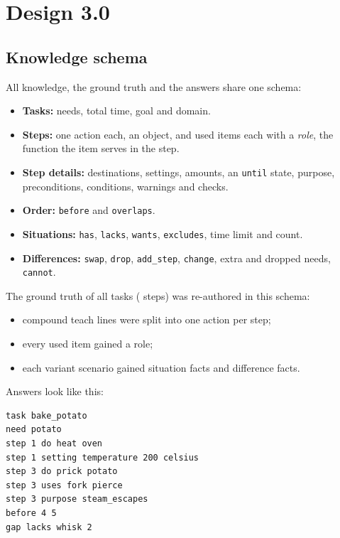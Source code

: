 \section{Design 3.0}

\subsection{Knowledge schema}
All knowledge, the ground truth and the answers share one schema:
\begin{itemize}
  \item \textbf{Tasks:} needs, total time, goal and domain.
  \item \textbf{Steps:} one action each, an object, and used items each with a \emph{role}, the function the item serves in the step.
  \item \textbf{Step details:} destinations, settings, amounts, an \texttt{until} state, purpose, preconditions, conditions, warnings and checks.
  \item \textbf{Order:} \texttt{before} and \texttt{overlaps}.
  \item \textbf{Situations:} \texttt{has}, \texttt{lacks}, \texttt{wants}, \texttt{excludes}, time limit and count.
  \item \textbf{Differences:} \texttt{swap}, \texttt{drop}, \texttt{add\_step}, \texttt{change}, extra and dropped needs, \texttt{cannot}.
\end{itemize}

The ground truth of all \gtTasks{} tasks (\gtSteps{} steps) was re-authored in this schema:
\begin{itemize}
  \item compound teach lines were split into one action per step;
  \item every used item gained a role;
  \item each variant scenario gained situation facts and difference facts.
\end{itemize}

Answers look like this:
\begin{lstlisting}
task bake_potato
need potato
step 1 do heat oven
step 1 setting temperature 200 celsius
step 3 do prick potato
step 3 uses fork pierce
step 3 purpose steam_escapes
before 4 5
gap lacks whisk 2
\end{lstlisting}

